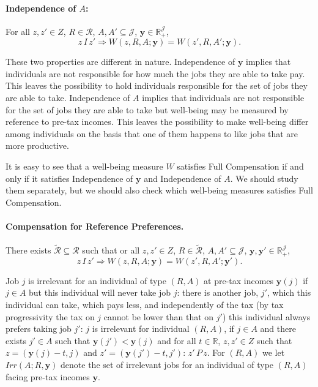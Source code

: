 \documentclass[12pt,thmsb]{article}
\begin{document}
\paragraph{Independence of $A$:} For all $z,z'\in Z$, $R\in \mathcal{R}$, $A,A'\subseteq \mathcal{J}$, $\mathbf{y}\in \mathbb{R}_{+}^{\mathcal{J}}$,
\begin{equation*}
z\,I\,z' \Rightarrow W(z,R,A;\mathbf{y})=W(z',R,A';\mathbf{y}).
\end{equation*}

These two properties are different in nature. Independence of $\mathbf{y}$ implies that individuals are not responsible for how much the jobs they are able to take pay. This leaves the possibility to hold individuals responsible for the set of jobs they are able to take. Independence of $A$ implies that individuals are not responsible for the set of jobs they are able to take but well-being may be measured by reference to pre-tax incomes. This leaves the possibility to make well-being differ among individuals on the basis that one of them happens to like jobs that are more productive.

It is easy to see that a well-being measure $W$ satisfies Full Compensation if and only if it satisfies Independence of $\mathbf{y}$ and Independence of $A$. We should study them separately, but we should also check which well-being measures satisfies Full Compensation.

\paragraph{Compensation for Reference Preferences.} There exists $\tilde{\mathcal{R}}\subseteq\mathcal{R}$ such that or all $z,z'\in Z$, $R\in \tilde{\mathcal{R}}$, $A,A'\subseteq \mathcal{J}$, $\mathbf{y}, \mathbf{y}' \in \mathbb{R}_{+}^{\mathcal{J}}$,
\begin{equation*}
z\,I\,z' \Rightarrow W(z,R,A;\mathbf{y})=W(z',R,A';\mathbf{y}').
\end{equation*}

Job $j$ is irrelevant for an individual of type $(R,A)$ at pre-tax incomes $\mathbf{y}(j)$ if $j\in A$ but this individual will never take job $j$: there is another job, $j'$, which this individual can take, which pays less, and independently of the tax (by tax progressivity the tax on $j$ cannot be lower than that on $j'$) this individual always prefers taking job $j'$: $j$ is irrelevant for individual $(R,A)$, if $j\in A$ and there exists $j'\in A$ such that $\mathbf{y}(j')<\mathbf{y}(j)$ and for all $t\in\mathbb{R}$, $z,z'\in Z$ such that $z=(\mathbf{y}(j)-t,j)$ and $z'=(\mathbf{y}(j')-t,j')$: $z'\,P\,z$. For $(R,A)$ we let $Irr(A;R,\mathbf{y})$ denote the set of irrelevant jobs for an individual of type $(R,A)$ facing pre-tax incomes $\mathbf{y}$.
\end{document}
